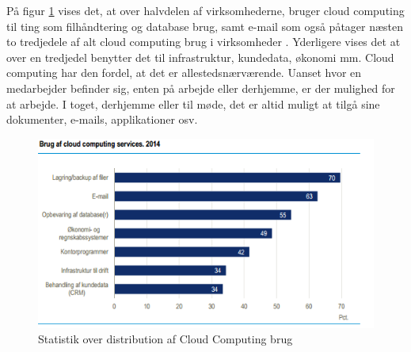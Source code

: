 På figur \ref{fig:distcc} vises det, at over halvdelen af virksomhederne, bruger cloud computing til ting som filhåndtering og database brug, samt e-mail som også påtager næsten to tredjedele af alt cloud computing brug i virksomheder
. Yderligere vises det at over en tredjedel benytter det til infrastruktur, kundedata, økonomi mm. Cloud computing har den fordel, at det er allestedsnærværende. Uanset hvor en medarbejder befinder sig, enten på arbejde eller derhjemme, er der mulighed for at arbejde. I toget, derhjemme eller til møde, det er altid muligt at tilgå sine dokumenter, e-mails, applikationer osv.
\begin{figure}
    \centering
    \includegraphics[width=1\textwidth]{figures/brugafccservices.png}
    \caption{Statistik over distribution af Cloud Computing brug \citep{itvirk}}
    \label{fig:distcc}
\end{figure}




